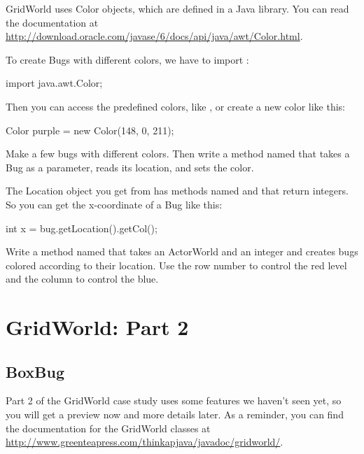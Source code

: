\begin{exercise}

GridWorld uses Color objects, which are defined in a Java library.
You can read the documentation at \url{http://download.oracle.com/javase/6/docs/api/java/awt/Color.html}.

To create Bugs with different colors, we have to import :

\begin{code}
import java.awt.Color;
\end{code}

Then you can access the predefined colors, like , or create a new color like this:

\begin{code}
    Color purple = new Color(148, 0, 211);
\end{code}

Make a few bugs with different colors.
Then write a method named  that takes a Bug as a parameter, reads its location, and sets the color.

The Location object you get from  has methods named  and  that return integers.
So you can get the x-coordinate of a Bug like this:

\begin{code}
    int x = bug.getLocation().getCol();
\end{code}

Write a method named  that takes an ActorWorld and an integer  and creates  bugs colored according to their location.
Use the row number to control the red level and the column to control the blue.

\end{exercise}


\chapter{GridWorld: Part 2}
\label{gridworld2}


\section{BoxBug}

Part 2 of the GridWorld case study uses some features we haven't seen yet, so you will get a preview now and more details later.
As a reminder, you can find the documentation for the GridWorld classes at \url{http://www.greenteapress.com/thinkapjava/javadoc/gridworld/}.

